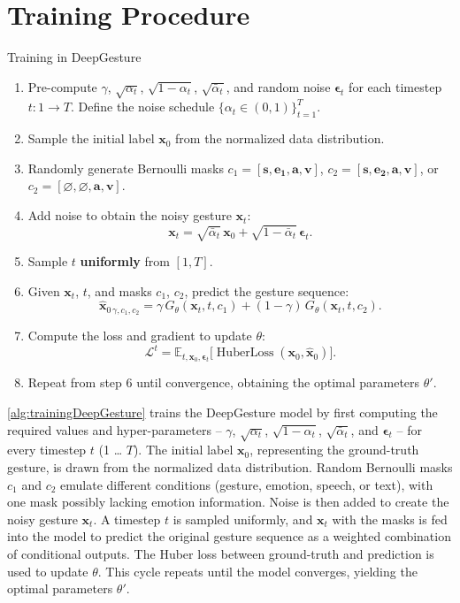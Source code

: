 \section{Training Procedure}

\begin{algorithm}[h]
	\caption{Training in DeepGesture}
	\label{alg:trainingDeepGesture}
	\setlength{\baselineskip}{10pt}
	\begin{enumerate}
		\item Pre-compute $\gamma$, $\sqrt{\alpha_t}$, $\sqrt{1-\alpha_t}$, $\sqrt{\bar{\alpha}_t}$, and random noise $\boldsymbol{\epsilon}_t$ for each timestep $t: 1 \rightarrow T$. Define the noise schedule $\{\alpha_t \in (0,1)\}_{t=1}^T$.
		\item Sample the initial label $\mathbf{x}_0$ from the normalized data distribution.
		\item Randomly generate Bernoulli masks
		$c_{1} = [ \mathbf{s}, \mathbf{e_1}, \mathbf{a}, \mathbf{v} ]$,
		$c_{2} = [ \mathbf{s}, \mathbf{e_2}, \mathbf{a}, \mathbf{v} ]$, or
		$c_{2} = [ \varnothing, \varnothing, \mathbf{a}, \mathbf{v} ]$.
		\item Add noise to obtain the noisy gesture $\mathbf{x}_t$:
		\[
		\mathbf{x}_t = \sqrt{\bar{\alpha}_t}\,\mathbf{x}_0 + \sqrt{1-\bar{\alpha}_t}\,\boldsymbol{\epsilon}_t.
		\]
		\item Sample $t$ \textbf{uniformly} from $[1, T]$.
		\item Given $\mathbf{x}_t$, $t$, and masks $c_1$, $c_2$, predict the gesture sequence:
		\[
		\hat{\mathbf{x}}_{0\,\gamma,c_{1},c_{2}}
		= \gamma\, G_{\theta}(\mathbf{x}_{t}, t, c_{1})
		+ (1-\gamma)\, G_{\theta}(\mathbf{x}_{t}, t, c_{2}).
		\]
		\item Compute the loss and gradient to update $\theta$:
		\[
		\mathcal{L}^t
		= \mathbb{E}_{t, \mathbf{x}_0, \boldsymbol{\epsilon}_t}
		\bigl[\operatorname{HuberLoss}(\mathbf{x}_0, \hat{\mathbf{x}}_0)\bigr].
		\]
		\item Repeat from step 6 until convergence, obtaining the optimal parameters $\theta'$.
	\end{enumerate}
\end{algorithm}

\autoref{alg:trainingDeepGesture} trains the DeepGesture model by first computing the required values and hyper-parameters -- 	$\gamma$, $\sqrt{\alpha_t}$, $\sqrt{1-\alpha_t}$, $\sqrt{\bar{\alpha}_t}$, and $\boldsymbol{\epsilon}_t$ -- for every timestep $t$ (1 … $T$).  
The initial label $\mathbf{x}_0$, representing the ground-truth gesture, is drawn from the normalized data distribution.  
Random Bernoulli masks $c_1$ and $c_2$ emulate different conditions (gesture, emotion, speech, or text), with one mask possibly lacking emotion information.  
Noise is then added to create the noisy gesture $\mathbf{x}_t$.  
A timestep $t$ is sampled uniformly, and $\mathbf{x}_t$ with the masks is fed into the model to predict the original gesture sequence as a weighted combination of conditional outputs.  
The Huber loss between ground-truth and prediction is used to update $\theta$.  
This cycle repeats until the model converges, yielding the optimal parameters $\theta'$.



